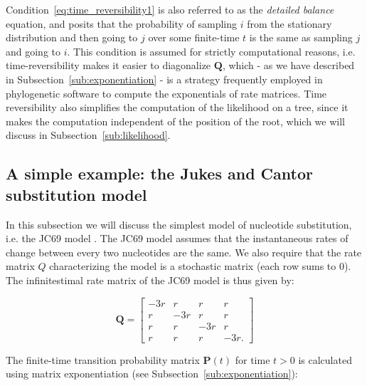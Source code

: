 \noindent
Condition~\ref{eq:time_reversibility1} is also referred to as the \emph{detailed balance} equation, and posits that the probability of sampling $i$ from the stationary distribution and then going to $j$ over some finite-time $t$ is the same as sampling $j$ and going to $i$. 
% 
% 
This condition is assumed for strictly computational reasons, i.e. time-reversibility makes it easier to diagonalize $\mathbf{Q}$, which - as we have described in 
Subsection~\ref{sub:exponentiation} - is a strategy frequently employed in phylogenetic software to compute the exponentials of rate matrices.
Time reversibility also simplifies the computation of the likelihood on a tree, since it makes the computation independent of the position of the root, which we will discuss in Subsection~\ref{sub:likelihood}.

\subsection{A simple example: the Jukes and Cantor substitution model\label{sub:jc69}}

In this subsection we will discuss the simplest model of nucleotide substitution, i.e. the JC69 model \citep{Jukes1969}.
The JC69 model assumes that the instantaneous rates of change between every two nucleotides are the same.
We also require that the rate matrix $Q$ characterizing the model is a stochastic matrix (each row sums to 0).
The infinitestimal rate matrix of the JC69 model is thus given by:

\begin{equation}
\mathbf{Q}=\left[\begin{array}{cccc}
-3r & r & r & r\\
r & -3r & r & r\\
r & r & -3r & r\\
r & r & r & -3r.
\end{array}\right]
\label{eq:jc69}
\end{equation}

\noindent
The finite-time transition probability matrix $\mathbf{P}(t)$ for time $t>0$ is calculated using matrix exponentiation  (see Subsection~\ref{sub:exponentiation}):

